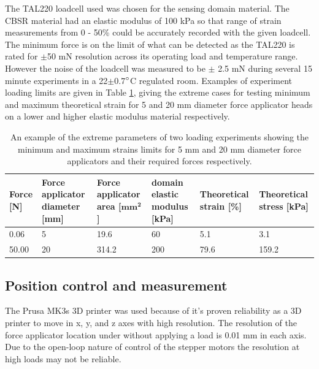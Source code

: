 The TAL220 loadcell used was chosen for the sensing domain material. The CBSR material had an elastic modulus of 100 kPa\cite{Ellingham2024} so that range of strain measurements from 0 - 50\% could be accurately recorded with the given loadcell. The minimum force is on the limit of what can be detected as the TAL220 is rated for $\pm$50 mN resolution \cite{HTCSensor2024} across its operating load and temperature range. However the noise of the loadcell was measured to be $\pm$ 2.5 mN during several 15 minute experiments in a 22$\pm$0.7$\degree$C regulated room. Examples of experiment loading limits are given in Table \ref{tab:cfa_limits}, giving the extreme cases for testing minimum and maximum theoretical strain for 5 and 20 mm diameter force applicator heads on a lower and higher elastic modulus material respectively.
\begin{table}[H]
\caption{An example of the extreme parameters of two loading experiments showing the minimum and maximum strains limits for 5 mm and 20 mm diameter force applicators and their required forces respectively.}
\label{tab:cfa_limits}
\begin{tabular}{|p{1.8cm}|p{3.5cm}|p{3.5cm}|p{3.1cm}|p{2.1cm}|p{2.2cm}|} \hline
	\textbf{Force [N]} &
	\textbf{Force applicator diameter [mm]} &
	\textbf{Force applicator area [$\mathbf{mm^2}$]} &
	\textbf{domain elastic modulus [kPa]} &
	\textbf{Theoretical strain [\%]} &
	\textbf{Theoretical stress [kPa]} \\ \hline
	0.06 &
	5 &
	19.6 &
	60 &
	5.1 &
	3.1 \\ \hline
	50.00 &
	20 &
	314.2 &
	200 &
	79.6 &
	159.2 \\ \hline
\end{tabular}
\end{table}



\subsection{Position control and measurement}
The Prusa MK3s 3D printer was used because of it's proven reliability as a 3D printer to move in x, y, and z axes with high resolution. The resolution of the force applicator location under without applying a load is 0.01 mm in each axis. Due to the open-loop nature of control of the stepper motors the resolution at high loads may not be reliable.

